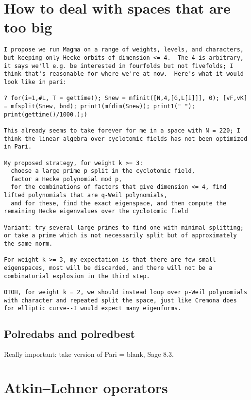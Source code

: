 \documentclass[11pt]{amsart}
\numberwithin{equation}{subsection}
\theoremstyle{definition}
\begin{document}
\section{How to deal with spaces that are too big}

\begin{verbatim}
I propose we run Magma on a range of weights, levels, and characters,
but keeping only Hecke orbits of dimension <= 4.  The 4 is arbitrary,
it says we'll e.g. be interested in fourfolds but not fivefolds; I
think that's reasonable for where we're at now.  Here's what it would
look like in pari:

? for(i=1,#L, T = gettime(); Snew = mfinit([N,4,[G,L[i]]], 0); [vF,vK]
= mfsplit(Snew, bnd); print1(mfdim(Snew)); print1(" ");
print(gettime()/1000.);)

This already seems to take forever for me in a space with N = 220; I
think the linear algebra over cyclotomic fields has not been optimized
in Pari.

My proposed strategy, for weight k >= 3:
  choose a large prime p split in the cyclotomic field,
  factor a Hecke polynomial mod p,
  for the combinations of factors that give dimension <= 4, find
lifted polynomials that are q-Weil polynomials,
  and for these, find the exact eigenspace, and then compute the
remaining Hecke eigenvalues over the cyclotomic field

Variant: try several large primes to find one with minimal splitting;
or take a prime which is not necessarily split but of approximately
the same norm.

For weight k >= 3, my expectation is that there are few small
eigenspaces, most will be discarded, and there will not be a
combinatorial explosion in the third step.

OTOH, for weight k = 2, we should instead loop over p-Weil polynomials
with character and repeated split the space, just like Cremona does
for elliptic curve--I would expect many eigenforms.
\end{verbatim}

\subsection{Polredabs and polredbest}

Really important: take version of Pari = blank, Sage 8.3.

\section{Atkin--Lehner operators}
\end{document}
